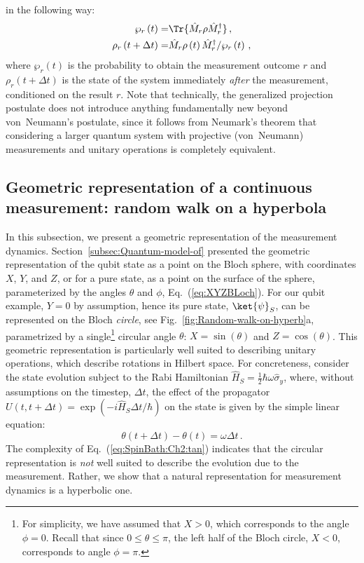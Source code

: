 in the following way:
\begin{align}
\wp_{r}\left(t\right)= & \Tr{\hat{M}_{r}\rho\hat{M}_{r}^{\dagger}}\,,\label{eq:GenMsrPosProb}\\
\rho_{r}\left(t+\Delta t\right)= & \hat{M}_{r}\rho\left(t\right)\hat{M}_{r}^{\dagger}/\wp_{r}\left(t\right)\,,\label{eq:GenMsrPosProj}
\end{align}
where $\wp_{r}\left(t\right)$ is the probability to obtain the measurement
outcome $r$ and $\rho_{r}\left(t+\Delta t\right)$ is the state
of the system immediately \emph{after} the measurement, conditioned
on the result $r$. Note that technically, the generalized projection
postulate does not introduce anything fundamentally new beyond von~Neumann's
postulate, since it follows from Neumark's theorem that considering
a larger quantum system with\emph{ }projective (von~Neumann) measurements
and unitary operations is completely equivalent.


\subsection{Geometric representation of a continuous measurement: random walk
on a hyperbola\label{subsec:Random-walk-on}}

In this subsection, we present a geometric representation of the measurement
dynamics. Section~\ref{subsec:Quantum-model-of} presented the geometric
representation of the qubit state as a point on the Bloch sphere,
with coordinates $X$, $Y$, and $Z$, or for a pure state, as a point
on the surface of the sphere, parameterized by the angles $\theta$
and $\phi$, Eq.~(\ref{eq:XYZBLoch}). For our qubit example, $Y=0$
by assumption,  hence its pure state, $\ket{\psi}_{S}$, can be represented
on the Bloch \emph{circle}, see Fig.~\ref{fig:Random-walk-on-hyperb}a,
parametrized by a single\footnote{For simplicity, we have assumed that $X>0$, which corresponds to
the angle $\phi=0$. Recall that since $0\leq\theta\leq\pi$, the
left half of the Bloch circle, $X<0$, corresponds to angle $\phi=\pi$.} circular angle $\theta$: $X=\sin\left(\theta\right)$ and $Z=\cos\left(\theta\right)$.
This geometric representation is particularly well suited to describing
unitary operations, which describe rotations in Hilbert space. For
concreteness, consider the state evolution subject to the Rabi Hamiltonian
$\hat{H}_{S}=\frac{1}{2}\hbar\omega\hat{\sigma}_{y}$, where, without
assumptions on the timestep, $\Delta t$, the effect of the propagator
$U\left(t,t+\Delta t\right)=\exp\left(-i\hat{H}_{S}\Delta t/\hbar\right)$
on the state is given by the simple linear equation: 
\begin{equation}
\theta\left(t+\Delta t\right)-\theta\left(t\right)=\omega\Delta t\,.\label{eq:SpinBathHRabi}
\end{equation}
The complexity of Eq.~(\ref{eq:SpinBath:Ch2:tan}) indicates that
the circular representation is \emph{not} well suited to describe
the evolution due to the measurement. Rather, we show that a natural
representation for measurement dynamics is a hyperbolic one. 

